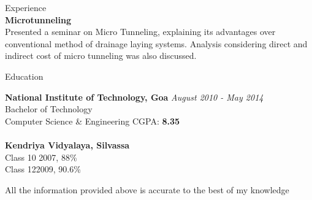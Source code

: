 \documentclass{resume} %
\begin{document}
\begin{rSection}{Experience}
\\{\bf Microtunneling}\\
Presented a seminar on Micro Tunneling, explaining its advantages over conventional method of drainage laying systems. Analysis considering direct and indirect cost of micro tunneling was also discussed.

\end{rSection}


\newpage
\begin{rSection}{Education}

{\bf National Institute of Technology, Goa} \hfill {\em August 2010 - May 2014} 
\\ Bachelor of Technology
\\ Computer Science & Engineering \hfill{CGPA: \bf{8.35}}\\
\\{\bf Kendriya Vidyalaya, Silvassa} 
\\ Class 10\hfill { 2007, 88\%}
\\ Class 12\hfill {2009, 90.6\%}


\end{rSection}
{All the information provided above is accurate to the best of my knowledge}
\end{document}
